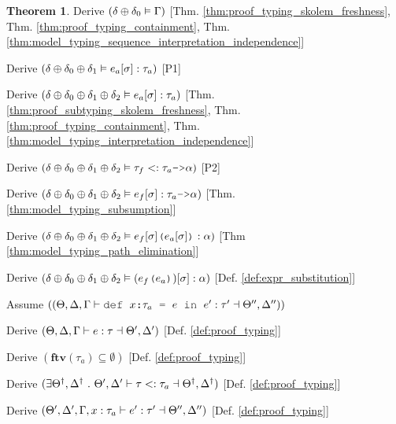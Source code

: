 \documentclass[acmsmall]{acmart}
\theoremstyle{definition}
\newtheorem{theorem}{Theorem}[section]
\begin{document}
\begin{theorem}
  \item \I\I \N Derive $(
    \delta \oplus \delta_0 \vDash \Gamma
  )$ [Thm. \ref{thm:proof_typing_skolem_freshness},
      Thm. \ref{thm:proof_typing_containment},
      Thm. \ref{thm:model_typing_sequence_interpretation_independence}]

  \item \I\I \N Derive $(
    \delta \oplus \delta_0 \oplus \delta_1 \vDash e_a[\sigma] : \tau_a
  )$ [P1]

  \item \I\I \N Derive $(
    \delta \oplus \delta_0 \oplus \delta_1 \oplus \delta_2 \vDash e_a[\sigma] : \tau_a
  )$ [Thm. \ref{thm:proof_subtyping_skolem_freshness}, 
      Thm. \ref{thm:proof_typing_containment},
      Thm. \ref{thm:model_typing_interpretation_independence}]

  \item \I\I \N Derive $(
    \delta \oplus \delta_0 \oplus \delta_1 \oplus \delta_2  \satisfies \tau_f \subtypes \tau_a \J{->} \alpha
  )$ [P2]

  \item \I\I \N Derive $(
    \delta \oplus \delta_0 \oplus \delta_1 \oplus \delta_2 \satisfies e_f[\sigma] \hastype \tau_a \J{->} \alpha
  )$ [Thm. \ref{thm:model_typing_subsumption}]

  \item \I\I \N Derive $(
    \delta \oplus \delta_0 \oplus \delta_1 \oplus \delta_2 \satisfies e_f[\sigma]\J{(}e_a[\sigma]\J{)} \hastype \alpha
  )$ [Thm \ref{thm:model_typing_path_elimination}]

  \item \I\I \N Derive $(
    \delta \oplus \delta_0 \oplus \delta_1 \oplus \delta_2 \satisfies (e_f\J{(}e_a\J{)})[\sigma] \hastype \alpha
  )$ [Def. \ref{def:expr_substitution}]


  \item \N Assume $(
    (\Theta, \Delta, \Gamma \entails \J{def } x \J{:} \tau_a \J{ = } e \J{ in } e' \hastype \tau' \given \Theta'', \Delta'')
  )$
  \item \I \N Derive $(
    \Theta, \Delta, \Gamma \vdash e : \tau \dashv \Theta', \Delta' 
  )$ [Def. \ref{def:proof_typing}]
  \item \I \N Derive $(
    \textbf{ftv}(\tau_a) \subseteq \emptyset
  )$ [Def. \ref{def:proof_typing}]
  \item \I \N Derive $(
    \exists \Theta^\dagger, \Delta^\dagger \ .\  \Theta', \Delta' \vdash \tau <: \tau_a \dashv \Theta^\dagger, \Delta^\dagger
  )$ [Def. \ref{def:proof_typing}]
  \item \I \N Derive $(
    \Theta', \Delta', \Gamma, x:\tau_a \vdash e' : \tau' \dashv \Theta'', \Delta''
  )$ [Def. \ref{def:proof_typing}]



\end{theorem}
\end{document}
